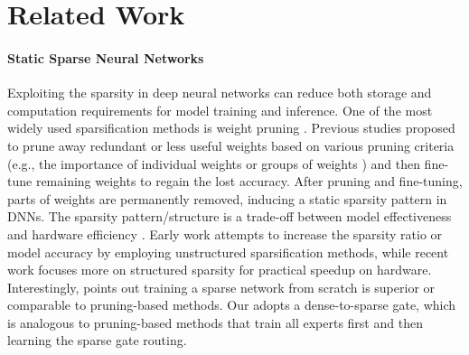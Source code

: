 \section{Related Work}
\label{sec:related_work}
\paragraph{Static Sparse Neural Networks}
Exploiting the sparsity in deep neural networks can reduce both storage and computation requirements for model training and inference.
One of the most widely used sparsification methods is weight pruning \citep{lecun1990optimal,han2015deep}.
Previous studies proposed to prune away redundant or less useful weights based on various pruning criteria (e.g., the importance of individual weights \citep{han2015deep} or groups of weights \citep{wen2016learning,luo2017thinet,he2017channel}) and then fine-tune remaining weights to regain the lost accuracy.
After pruning and fine-tuning, parts of weights are permanently removed, inducing a static sparsity pattern in DNNs.
The sparsity pattern/structure is a trade-off between model effectiveness and hardware efficiency \citep{mao2017exploring}. %
Early work attempts to increase the sparsity ratio or model accuracy by employing unstructured sparsification methods, while recent work focuses more on structured sparsity for practical speedup on hardware.
Interestingly, \cite{frankle2018lottery} points out training a sparse network from scratch is superior or comparable to pruning-based methods.
Our \evomoe{} adopts a dense-to-sparse gate, which is analogous to pruning-based methods that train all experts first and then learning the sparse gate routing.


